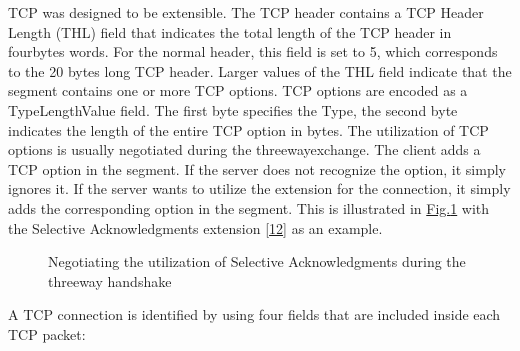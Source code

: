 \documentclass[letterpaper,10pt,english]{sphinxmanual}
\begin{document}
TCP was designed to be extensible. The TCP header contains a TCP Header Length (THL) field that indicates the total length of the TCP header in four\sphinxhyphen{}bytes words. For the normal header, this field is set to 5, which corresponds to the 20 bytes long TCP header. Larger values of the THL field indicate that the segment contains one or more TCP options. TCP options are encoded as a Type\sphinxhyphen{}Length\sphinxhyphen{}Value field. The first byte specifies the Type, the second byte indicates the length of the entire TCP option in bytes. The utilization of TCP options is usually negotiated during the three\sphinxhyphen{}way\sphinxhyphen{}exchange. The client adds a TCP option in the  segment. If the server does not recognize the option, it simply ignores it. If the server wants to utilize the extension for the connection, it simply adds the corresponding option in the  segment. This is illustrated in \hyperref[\detokenize{tcp:fig-tcp-handshake-sack}]{Fig.\@ \ref{\detokenize{tcp:fig-tcp-handshake-sack}}} with the Selective Acknowledgments extension {[}\hyperlink{cite.biblio:id1948}{12}{]} as an example.
\begin{figure}[htbp]\centering\capstart{}\caption{Negotiating the utilization of Selective Acknowledgments during the three\sphinxhyphen{}way handshake}\label{\detokenize{tcp:id6}}\label{\detokenize{tcp:fig-tcp-handshake-sack}}\end{figure}
\sphinxAtStartPar
A TCP connection is identified by using four fields that are included inside each TCP packet:
\end{document}
